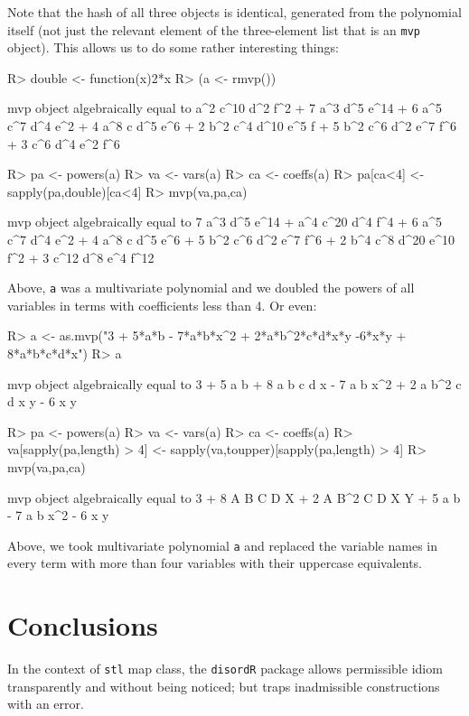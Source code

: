 \documentclass{article}
\begin{document}
Note that the hash of all three objects is identical, generated from
the polynomial itself (not just the relevant element of the
three-element list that is an {\tt mvp} object).  This allows us to do
some rather interesting things:

\begin{Schunk}
\begin{Sinput}
R> double <- function(x){2*x}
R> (a <- rmvp())
\end{Sinput}
\begin{Soutput}
mvp object algebraically equal to
a^2 c^10 d^2 f^2  +  7 a^3 d^5 e^14  +  6 a^5 c^7 d^4 e^2  +  4 a^8 c d^5 e^6  +
2 b^2 c^4 d^10 e^5 f  +  5 b^2 c^6 d^2 e^7 f^6  +  3 c^6 d^4 e^2 f^6

\end{Soutput}
\begin{Sinput}
R> pa <- powers(a)
R> va <- vars(a)
R> ca <- coeffs(a)
R> pa[ca<4] <- sapply(pa,double)[ca<4]
R> mvp(va,pa,ca)
\end{Sinput}
\begin{Soutput}
mvp object algebraically equal to
7 a^3 d^5 e^14  +  a^4 c^20 d^4 f^4  +  6 a^5 c^7 d^4 e^2  +
4 a^8 c d^5 e^6  +  5 b^2 c^6 d^2 e^7 f^6  +  2 b^4 c^8 d^20 e^10 f^2  +
3 c^12 d^8 e^4 f^12
\end{Soutput}
\end{Schunk}

Above, {\tt a} was a multivariate polynomial and we doubled the powers
of all variables in terms with coefficients less than 4. Or even:

\begin{Schunk}
\begin{Sinput}
R> a <- as.mvp("3 + 5*a*b - 7*a*b*x^2 + 2*a*b^2*c*d*x*y -6*x*y + 8*a*b*c*d*x")
R> a
\end{Sinput}
\begin{Soutput}
mvp object algebraically equal to
3  +  5 a b  +  8 a b c d x  -  7 a b x^2  +  2 a b^2 c d x y  -  6 x y
\end{Soutput}
\begin{Sinput}
R> pa <- powers(a)
R> va <- vars(a)
R> ca <- coeffs(a)
R> va[sapply(pa,length) > 4] <- sapply(va,toupper)[sapply(pa,length) > 4]
R> mvp(va,pa,ca)
\end{Sinput}
\begin{Soutput}
mvp object algebraically equal to
3  +  8 A B C D X  +  2 A B^2 C D X Y  +  5 a b  -  7 a b x^2  -  6 x y
\end{Soutput}
\end{Schunk}

Above, we took multivariate polynomial {\tt a} and replaced the variable
names in every term with more than four variables with their uppercase
equivalents.

\section{Conclusions}

In the context of {\tt stl} map class, the {\tt disordR} package
allows permissible idiom transparently and without being noticed; but
traps inadmissible constructions with an error.



\end{document}
